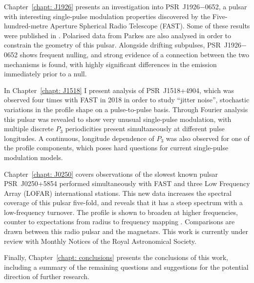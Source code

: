 Chapter~\ref{chapt: J1926} presents an investigation into PSR~J1926$-$0652, a pulsar with interesting single-pulse modulation properties discovered by the Five-hundred-metre Aperture Spherical Radio Telescope (FAST). Some of these results were published in \citet{ZLH+2019}. Polarised data from Parkes are also analysed in order to constrain the geometry of this pulsar. Alongside drifting subpulses, PSR~J1926$-$0652 shows frequent nulling, and strong evidence of a connection between the two mechanisms is found, with highly significant differences in the emission immediately prior to a null.

In Chapter~\ref{chapt: J1518} I present analysis of PSR~J1518+4904, which was observed four times with FAST in 2018 in order to study ``jitter noise'', stochastic variations in the profile shape on a pulse-to-pulse basis. Through Fourier analysis this pulsar was revealed to show very unusual single-pulse modulation, with multiple discrete $P_3$ periodicities present simultaneously at different pulse longitudes. A continuous, longitude dependence of $P_3$ was also observed for one of the profile components, which poses hard questions for current single-pulse modulation models.

Chapter~\ref{chapt: J0250} covers observations of the slowest known pulsar PSR~J0250+5854 \citep[$P_1 = 23.5$~s, ][]{TBC+2018} performed simultaneously with FAST and three Low Frequency Array (LOFAR) international stations. This new data increases the spectral coverage of this pulsar five-fold, and reveals that it has a steep spectrum with a low-frequency turnover. The profile is shown to broaden at higher frequencies, counter to expectations from radius to frequency mapping \citep[e.g.][]{KGxx2003}. Comparisons are drawn between this radio pulsar and the magnetars. This work is currently under review with Monthly Notices of the Royal Astronomical Society.


Finally, Chapter~\ref{chapt: conclusions} presents the conclusions of this work, including a summary of the remaining questions and suggestions for the potential direction of further research.